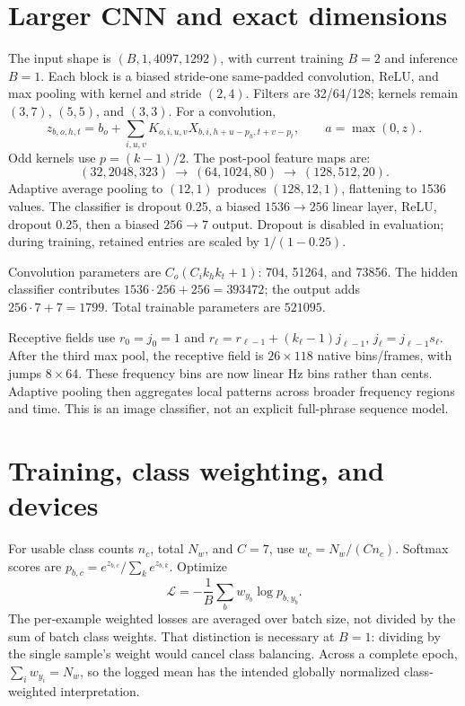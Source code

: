 \documentclass[11pt,a4paper]{article}
\begin{document}
\section{Larger CNN and exact dimensions}
The input shape is $(B,1,4097,1292)$, with current training $B=2$ and inference
$B=1$. Each block is a
biased stride-one same-padded convolution, ReLU, and max pooling with kernel and
stride $(2,4)$. Filters are 32/64/128; kernels remain $(3,7)$, $(5,5)$, and $(3,3)$.
For a convolution,
\[
z_{b,o,h,t}=b_o+\sum_{i,u,v}K_{o,i,u,v}X_{b,i,h+u-p_h,t+v-p_t},\qquad
a=\max(0,z).
\]
Odd kernels use $p=(k-1)/2$. The post-pool feature maps are:
\[
(32,2048,323)\ \longrightarrow\ (64,1024,80)\ \longrightarrow\ (128,512,20).
\]
Adaptive average pooling to $(12,1)$ produces $(128,12,1)$, flattening to 1536
values. The classifier is dropout 0.25, a biased $1536\to256$ linear layer, ReLU,
dropout 0.25, then a biased $256\to7$ output. Dropout is disabled in evaluation;
during training, retained entries are scaled by $1/(1-0.25)$.

Convolution parameters are $C_o(C_i k_h k_t+1)$: 704, 51264, and 73856.
The hidden classifier contributes $1536\cdot256+256=393472$; the output adds
$256\cdot7+7=1799$. Total trainable parameters are $521095$.

Receptive fields use $r_0=j_0=1$ and
$r_\ell=r_{\ell-1}+(k_\ell-1)j_{\ell-1}$,
$j_\ell=j_{\ell-1}s_\ell$. After the third max pool, the receptive field is
$26\times118$ native bins/frames, with jumps $8\times64$. These frequency bins
are now linear Hz bins rather than cents. Adaptive pooling then aggregates local
patterns across broader frequency regions and time. This is an image classifier,
not an explicit full-phrase sequence model.

\section{Training, class weighting, and devices}
For usable class counts $n_c$, total $N_w$, and $C=7$, use $w_c=N_w/(Cn_c)$.
Softmax scores are $p_{b,c}=e^{z_{b,c}}/\sum_k e^{z_{b,k}}$. Optimize
\[
\mathcal L=-\frac1B\sum_b w_{y_b}\log p_{b,y_b}.
\]
The per-example weighted losses are averaged over batch size, not divided by
the sum of batch class weights. That distinction is necessary at $B=1$:
dividing by the single sample's weight would cancel class balancing. Across a
complete epoch, $\sum_i w_{y_i}=N_w$, so the logged mean has the intended globally
normalized class-weighted interpretation.
\end{document}
